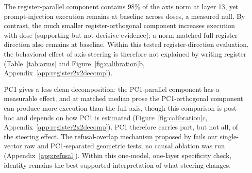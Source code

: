 The register-parallel component contains 98\% of the axis norm at layer 13,
yet prompt-injection execution remains at baseline across doses, a measured
null. By contrast, the much smaller register-orthogonal component increases
execution with dose (supporting but not decisive evidence); a
norm-matched full register direction also remains at baseline. Within this
tested register-direction evaluation, the behavioral effect of axis steering
is therefore not explained by writing register (Table~\ref{tab:arms} and
Figure~\ref{fig:calibration}b, Appendix~\ref{app:register2x2decomp}).

PC1 gives a less clean decomposition: the PC1-parallel component has a
measurable effect, and at matched median prose the PC1-orthogonal component can produce more
execution than the full axis, though this comparison is post hoc and depends on how PC1 is estimated
(Figure~\ref{fig:calibration}c, Appendix~\ref{app:register2x2decomp}). PC1
therefore carries part, but not all, of the steering effect. The refusal-overlap
mechanism proposed by \citet{li2026pitfalls} fails our single-vector raw and
PC1-separated geometric tests; no causal ablation was run (Appendix~\ref{app:refusal}).
Within this one-model, one-layer specificity check, identity remains the best-supported
interpretation of what steering changes.
